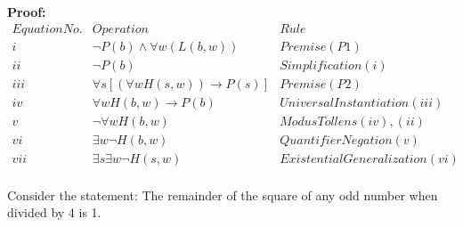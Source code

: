 \documentclass[addpoints]{exam}
\begin{document}
\begin{questions}
\begin{parts}
\begin{solution}
      \textbf{Proof:}\\
      \[
        \begin{array}{c|c|c}
          Equation No. & Operation                                      & Rule                            \\
          \hline
          i            & \neg P(b) \wedge \forall w(L(b,w))             & Premise (P1)                    \\
          ii           & \neg P(b)                                      & Simplification (i)              \\
          iii          & \forall s[(\forall w H(s,w)) \rightarrow P(s)] & Premise (P2)                    \\
          iv           & \forall w H(b,w) \rightarrow P(b)              & Universal Instantiation (iii)   \\
          v            & \neg \forall w H(b,w)                          & Modus Tollens (iv),(ii)         \\
          vi           & \exists w \neg H(b,w)                          & QuantifierNegation (v)          \\
          vii          & \exists s \exists w \neg H(s,w)                & Existential Generalization (vi) \\
        \end{array}
      \]
    \end{solution}
  \end{parts}

\question[5]
  Consider the statement: The remainder of the square of any odd number when divided by 4 is 1.
  
\end{questions}
\end{document}
